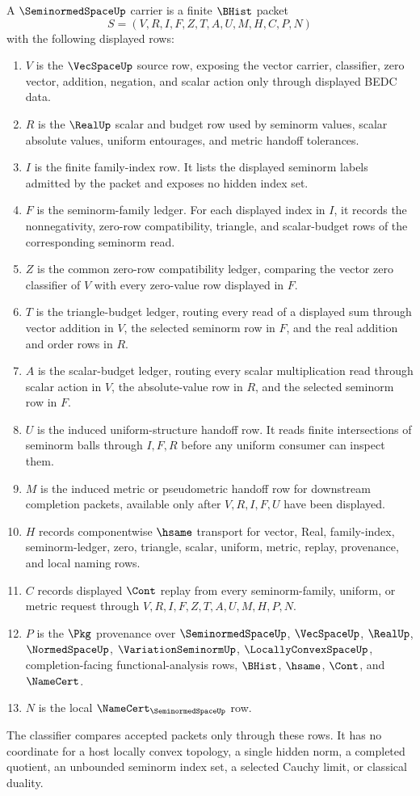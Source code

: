 \begin{definition}
\label{def:seminormed-space-carrier}
A $\SeminormedSpaceUp$ carrier is a finite $\BHist$ packet
$$
S=(V,R,I,F,Z,T,A,U,M,H,C,P,N)
$$
with the following displayed rows:
\begin{enumerate}
\item $V$ is the $\VecSpaceUp$ source row, exposing the vector carrier, classifier, zero vector, addition, negation, and scalar action only through displayed BEDC data.
\item $R$ is the $\RealUp$ scalar and budget row used by seminorm values, scalar absolute values, uniform entourages, and metric handoff tolerances.
\item $I$ is the finite family-index row. It lists the displayed seminorm labels admitted by the packet and exposes no hidden index set.
\item $F$ is the seminorm-family ledger. For each displayed index in $I$, it records the nonnegativity, zero-row compatibility, triangle, and scalar-budget rows of the corresponding seminorm read.
\item $Z$ is the common zero-row compatibility ledger, comparing the vector zero classifier of $V$ with every zero-value row displayed in $F$.
\item $T$ is the triangle-budget ledger, routing every read of a displayed sum through vector addition in $V$, the selected seminorm row in $F$, and the real addition and order rows in $R$.
\item $A$ is the scalar-budget ledger, routing every scalar multiplication read through scalar action in $V$, the absolute-value row in $R$, and the selected seminorm row in $F$.
\item $U$ is the induced uniform-structure handoff row. It reads finite intersections of seminorm balls through $I,F,R$ before any uniform consumer can inspect them.
\item $M$ is the induced metric or pseudometric handoff row for downstream completion packets, available only after $V,R,I,F,U$ have been displayed.
\item $H$ records componentwise $\hsame$ transport for vector, Real, family-index, seminorm-ledger, zero, triangle, scalar, uniform, metric, replay, provenance, and local naming rows.
\item $C$ records displayed $\Cont$ replay from every seminorm-family, uniform, or metric request through $V,R,I,F,Z,T,A,U,M,H,P,N$.
\item $P$ is the $\Pkg$ provenance over $\SeminormedSpaceUp$, $\VecSpaceUp$, $\RealUp$, $\NormedSpaceUp$, $\VariationSeminormUp$, $\LocallyConvexSpaceUp$, completion-facing functional-analysis rows, $\BHist$, $\hsame$, $\Cont$, and $\NameCert$.
\item $N$ is the local $\NameCert_{\SeminormedSpaceUp}$ row.
\end{enumerate}
The classifier compares accepted packets only through these rows. It has no coordinate for a host locally convex topology, a single hidden norm, a completed quotient, an unbounded seminorm index set, a selected Cauchy limit, or classical duality.
\end{definition}
